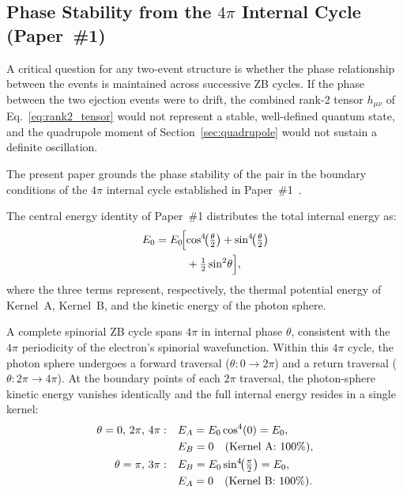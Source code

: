 \documentclass[%
 reprint, amsmath,amssymb, aps, prb, ]{revtex4-2}
\numberwithin{equation}{section}
\newcommand{\iphase}{\theta}
\begin{document}
\subsection{Phase Stability from the $4\pi$ Internal Cycle (Paper~\protect\#1)}
\label{subsec:4pi_58}

A critical question for any two-event structure is whether the phase relationship between the events is maintained across successive ZB cycles.
If the phase between the two ejection events were to drift, the combined rank-2 tensor $h_{\mu\nu}$ of Eq.~\eqref{eq:rank2_tensor} would not represent a stable, well-defined quantum state, and the quadrupole moment of Section~\ref{sec:quadrupole} would not sustain a definite oscillation.

The present paper grounds the phase stability of the pair in the boundary conditions of the $4\pi$ internal cycle established in Paper~\#1~\cite{hanamura01}.

The central energy identity of Paper~\#1 distributes the total internal energy as:
\begin{align}
E_0 &= E_0\!\Bigl[
\cos^4\!\!\left(\tfrac{\iphase}{2}\right)
+ \sin^4\!\!\left(\tfrac{\iphase}{2}\right)
\notag\\
&\phantom{{}= E_0\!\Bigl[}
+ \tfrac{1}{2}\sin^2\!\iphase
\Bigr],
\label{eq:energy_identity}
\end{align}
where the three terms represent, respectively, the thermal potential energy of Kernel~A, Kernel~B, and the kinetic energy of the photon sphere.

A complete spinorial ZB cycle spans $4\pi$ in internal phase $\iphase$, consistent with the $4\pi$ periodicity of the electron's spinorial wavefunction.
Within this $4\pi$ cycle, the photon sphere undergoes a forward traversal ($\iphase: 0 \to 2\pi$) and a return traversal ($\iphase: 2\pi \to 4\pi$).
At the boundary points of each $2\pi$ traversal, the photon-sphere kinetic energy vanishes identically and the full internal energy resides in a single kernel:
\begin{align}
\iphase = 0,\, 2\pi,\, 4\pi:
&\quad E_A = E_0\cos^4(0) = E_0,\notag\\
&\quad E_B = 0 \quad (\text{Kernel A: 100\%}),\label{eq:boundary_A}\\
\iphase = \pi,\, 3\pi:
&\quad E_B = E_0\sin^4\!\!\left(\tfrac{\pi}{2}\right) = E_0,\notag\\
&\quad E_A = 0 \quad (\text{Kernel B: 100\%}).\label{eq:boundary_B}
\end{align}
\end{document}
